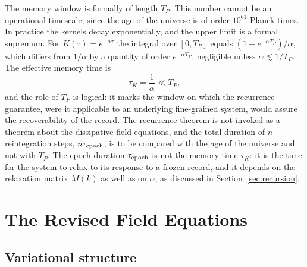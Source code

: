 \documentclass[11pt]{article}
\theoremstyle{definition}
\theoremstyle{remark}
\begin{document}
The memory window is formally of length $T_P$. This number cannot be an operational timescale, since the age of the universe is of order $10^{61}$ Planck times. In practice the kernels decay exponentially, and the upper limit is a formal supremum. For $K(\tau)=e^{-\alpha\tau}$ the integral over $[0,T_P]$ equals $(1-e^{-\alpha T_P})/\alpha$, which differs from $1/\alpha$ by a quantity of order $e^{-\alpha T_P}$, negligible unless $\alpha\lesssim1/T_P$. The effective memory time is
\begin{equation}
\tau_K=\frac1\alpha\ll T_P,
\end{equation}
and the role of $T_P$ is logical: it marks the window on which the recurrence guarantee, were it applicable to an underlying fine-grained system, would assure the recoverability of the record. The recurrence theorem is not invoked as a theorem about the dissipative field equations, and the total duration of $n$ reintegration steps, $n\tau_{\rm epoch}$, is to be compared with the age of the universe and not with $T_P$. The epoch duration $\tau_{\rm epoch}$ is not the memory time $\tau_K$: it is the time for the system to relax to its response to a frozen record, and it depends on the relaxation matrix $M(k)$ as well as on $\alpha$, as discussed in Section~\ref{sec:recursion}.

\section{The Revised Field Equations}\label{sec:equations}

\subsection{Variational structure}
\end{document}
